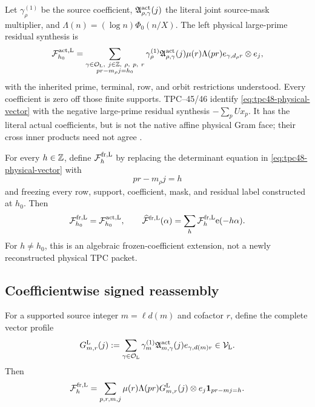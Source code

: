 Let \(\gamma_\rho^{(1)}\) be the source coefficient,
\(\mathfrak A_{\rho,\gamma}^{\rm act}(j)\) the literal joint
source-mask multiplier, and \(\Lambda(n)=(\log n)\Phi_0(n/X)\).
The left physical large-prime residual synthesis is
\begin{equation}
 \mathcal F_{h_0}^{\rm act,\mathrm L}
 =\sum_{\substack{\gamma\in\mathcal O_{\mathrm L},\ j\in\mathbb Z,\ \rho,\ p,\ r\\
                   pr-m_\rho j=h_0}}
 \gamma_\rho^{(1)}
 \mathfrak A_{\rho,\gamma}^{\rm act}(j)
 \mu(r)\Lambda(pr)
 e_{\gamma,d_\rho r}\otimes e_j,
 \label{eq:tpc48-physical-vector}
\end{equation}
with the inherited prime, terminal, row, and orbit restrictions
understood.  Every coefficient is zero off those finite supports.
TPC--45/46 identify \eqref{eq:tpc48-physical-vector} with the negative
large-prime residual synthesis \(-\sum_pUx_p\).  It has the literal
actual coefficients, but is not the native affine physical Gram face;
their cross inner products need not agree
\citep{WangTPC45,WangTPC46,WangTPC47}.

For every \(h\in\mathbb Z\), define \(\mathcal F_h^{\rm fr,\mathrm L}\) by replacing the
determinant equation in \eqref{eq:tpc48-physical-vector} with
\begin{equation}
 pr-m_\rho j=h
 \label{eq:tpc48-frozen-determinant}
\end{equation}
and freezing every row, support, coefficient, mask, and residual label
constructed at \(h_0\).  Then
\begin{equation}
 \mathcal F_{h_0}^{\rm fr,\mathrm L}=\mathcal F_{h_0}^{\rm act,\mathrm L},
 \qquad
 \widehat{\mathcal F}^{\rm fr,\mathrm L}(\alpha)
 =\sum_h\mathcal F_h^{\rm fr,\mathrm L}\mathrm e(-h\alpha).
 \label{eq:tpc48-frozen-transform}
\end{equation}
For \(h\ne h_0\), this is an algebraic frozen-coefficient extension,
not a newly reconstructed physical TPC packet.

\subsection{Coefficientwise signed reassembly}

For a supported source integer \(m=\ell d(m)\) and cofactor \(r\),
define the complete vector profile
\begin{equation}
 G_{m,r}^{\mathrm L}(j)
 :=\sum_{\gamma\in\mathcal O_{\mathrm L}}
 \gamma_m^{(1)}\mathfrak A_{m,\gamma}^{\rm act}(j)
 e_{\gamma,d(m)r}\in\mathcal V_{\mathrm L}.
 \label{eq:tpc48-vector-profile}
\end{equation}
Then
\begin{equation}
 \mathcal F_h^{\rm fr,\mathrm L}
 =\sum_{p,r,m,j}
 \mu(r)\Lambda(pr)G_{m,r}^{\mathrm L}(j)\otimes e_j
 \mathbf 1_{pr-mj=h}.
 \label{eq:tpc48-vector-frozen-family}
\end{equation}

